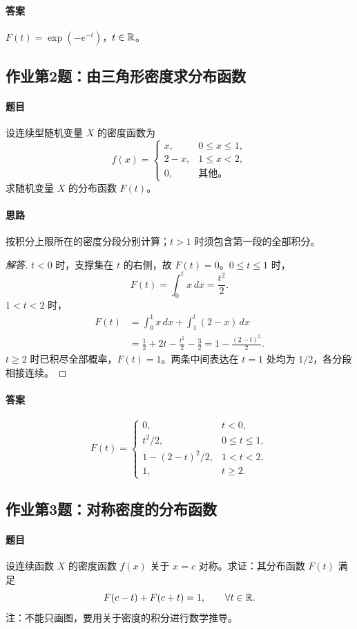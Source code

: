 \paragraph{答案} $F(t)=\exp(-e^{-t})$，$t\in\mathbb R$。

\subsection{作业第2题：由三角形密度求分布函数}\label{ex:w08-h2}
\paragraph{题目}
设连续型随机变量 $X$ 的密度函数为
\[
f(x)=\begin{cases}x,&0\leq x\leq1,\\2-x,&1\leq x<2,\\0,&\text{其他。}\end{cases}
\]
求随机变量 $X$ 的分布函数 $F(t)$。
\paragraph{思路} 按积分上限所在的密度分段分别计算；$t>1$ 时须包含第一段的全部积分。
\begin{proof}[解答]
$t<0$ 时，支撑集在 $t$ 的右侧，故 $F(t)=0$。$0\leq t\leq1$ 时，
\[
F(t)=\int_0^t x\,dx=\frac{t^2}2.
\]
$1<t<2$ 时，
\begin{align*}
F(t)&=\int_0^1x\,dx+\int_1^t(2-x)\,dx\\
&=\frac12+2t-\frac{t^2}2-\frac32
=1-\frac{(2-t)^2}2.
\end{align*}
$t\geq2$ 时已积尽全部概率，$F(t)=1$。两条中间表达在 $t=1$ 处均为 $1/2$，各分段相接连续。
\end{proof}
\paragraph{答案}
\[
F(t)=\begin{cases}0,&t<0,\\t^2/2,&0\leq t\leq1,\\1-(2-t)^2/2,&1<t<2,\\1,&t\geq2.\end{cases}
\]

\subsection{作业第3题：对称密度的分布函数}\label{ex:w08-h3}
\paragraph{题目}
设连续函数 $X$ 的密度函数 $f(x)$ 关于 $x=c$ 对称。求证：其分布函数 $F(t)$ 满足
\[
F(c-t)+F(c+t)=1,\qquad\forall t\in\mathbb R.
\]
注：不能只画图，要用关于密度的积分进行数学推导。
